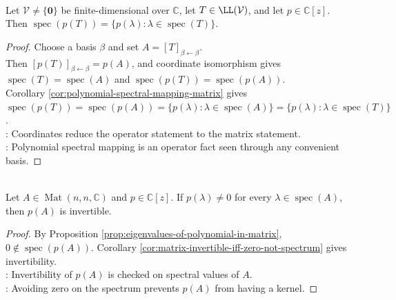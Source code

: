 \begin{corollary} \label{cor:polynomial-spectral-mapping-operator} \\
Let $\mathcal{V}\neq\{\mathbf{0}\}$ be finite-dimensional over $\mathbb{C}$, let $T\in\LL(\mathcal{V})$, and let $p\in\mathbb{C}[z]$.\\
Then $\operatorname{spec}(p(T))=\{p(\lambda):\lambda\in\operatorname{spec}(T)\}$.
\begin{proof}
Choose a basis $\beta$ and set $A=[T]_{\beta\leftarrow\beta}$.\\
Then $[p(T)]_{\beta\leftarrow\beta}=p(A)$, and coordinate isomorphism gives $\operatorname{spec}(T)=\operatorname{spec}(A)$ and $\operatorname{spec}(p(T))=\operatorname{spec}(p(A))$.\\
Corollary \ref{cor:polynomial-spectral-mapping-matrix} gives $\operatorname{spec}(p(T))=\operatorname{spec}(p(A))=\{p(\lambda):\lambda\in\operatorname{spec}(A)\}=\{p(\lambda):\lambda\in\operatorname{spec}(T)\}$.\\
: Coordinates reduce the operator statement to the matrix statement.\\
: Polynomial spectral mapping is an operator fact seen through any convenient basis.
\end{proof}
\end{corollary}

\begin{corollary} \label{cor:polynomial-in-matrix-invertible-spectrum-test} \\
Let $A\in\operatorname{Mat}(n,n,\mathbb{C})$ and $p\in\mathbb{C}[z]$. If $p(\lambda)\neq0$ for every $\lambda\in\operatorname{spec}(A)$, then $p(A)$ is invertible.
\begin{proof}
By Proposition \ref{prop:eigenvalues-of-polynomial-in-matrix}, $0\notin\operatorname{spec}(p(A))$. Corollary \ref{cor:matrix-invertible-iff-zero-not-spectrum} gives invertibility.\\
: Invertibility of $p(A)$ is checked on spectral values of $A$.\\
: Avoiding zero on the spectrum prevents $p(A)$ from having a kernel.
\end{proof}
\end{corollary}

